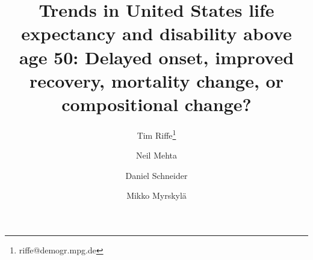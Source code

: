 \newcommand{\absdiv}[1]{%
  \par\addvspace{.5\baselineskip}%
  \noindent\textbf{#1}\quad\ignorespaces
}
\newcommand{\rd}[1]{\textcolor{red}{#1}}





\title{Trends in United States life expectancy and disability above age 50: Delayed onset, improved recovery, mortality change, or compositional change?}

\author[1]{Tim Riffe\thanks{riffe@demogr.mpg.de}}
\author[2]{Neil Mehta}
\author[1]{Daniel Schneider}
\author[1,3]{Mikko Myrskyl\"a}



%              
%

